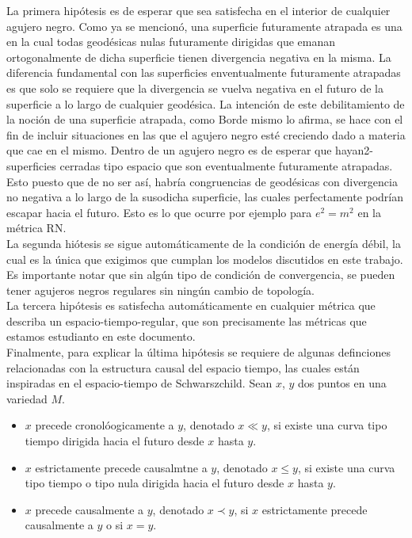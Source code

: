 \documentclass[16pt,a4paper]{article}
\numberwithin{equation}{section}
\theoremstyle{definition}
\begin{document}
La primera hipótesis es de esperar que sea satisfecha en el interior de cualquier agujero negro. Como ya se mencionó, una superficie futuramente atrapada es una en la cual todas geodésicas nulas futuramente dirigidas que emanan ortogonalmente de dicha superficie tienen divergencia negativa en la misma. La diferencia fundamental con las superficies enventualmente futuramente atrapadas es que solo se requiere que la divergencia se vuelva negativa en el futuro de la superficie a lo largo de cualquier geodésica. La intención de este debilitamiento de la noción de una superficie atrapada, como Borde mismo lo afirma, se hace con el fin de incluir situaciones en las que el agujero negro esté creciendo dado a materia que cae en el mismo. Dentro de un agujero negro es de esperar que hayan2-superficies cerradas tipo espacio que son eventualmente  futuramente atrapadas. Esto puesto que de no ser así, habría congruencias de geodésicas con divergencia no negativa a lo largo de la susodicha superficie, las cuales perfectamente podrían escapar hacia el futuro. Esto es lo que ocurre por ejemplo para $e^2 = m^2$ en la métrica RN.\\

La segunda hiótesis se sigue automáticamente de la condición de energía débil, la cual es la única que exigimos que cumplan los modelos discutidos en este trabajo. Es importante notar que sin algún tipo de condición de convergencia, se pueden tener agujeros negros regulares sin ningún cambio de topología.\\

La tercera hipótesis es satisfecha automáticamente en cualquier métrica que describa un espacio-tiempo-regular, que son precisamente las métricas que estamos estudianto en este documento.\\

Finalmente, para explicar la última hipótesis se requiere de algunas definciones relacionadas con la estructura causal del espacio tiempo, las cuales están inspiradas en el espacio-tiempo de Schwarszchild. Sean $x$, $y$ dos puntos en una variedad $M$.
\begin{itemize}
\item $x$ precede cronolóogicamente a $y$, denotado $x \ll y$, si existe una curva tipo tiempo dirigida hacia el futuro desde $x$ hasta $y$.

\item $x$ estrictamente precede causalmtne a $y$, denotado $x \leq y$, si existe una curva tipo tiempo o tipo nula dirigida hacia el futuro desde $x$ hasta $y$.

\item $x$ precede causalmente a $y$, denotado $x \prec y$, si $x$ estrictamente precede causalmente a $y$ o si $x = y$.
\end{itemize}
\end{document}

